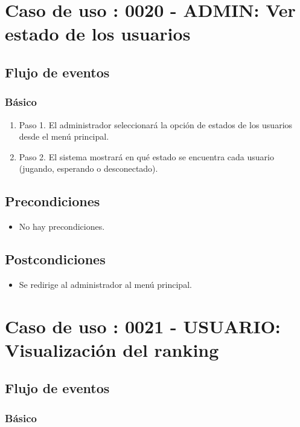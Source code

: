 \section{Caso de uso : 0020 - ADMIN: Ver estado de los usuarios}\label{sec:uc0}
\subsection{Flujo de eventos}
\subsubsection{Básico}

\begin{enumerate}
\item Paso 1.
El administrador seleccionará la opción de estados de los usuarios desde el menú principal.
\item Paso 2.
El sistema mostrará en qué estado se encuentra cada usuario (jugando, esperando o desconectado).
\end{enumerate}

\subsection{Precondiciones}
\begin{itemize}
\item No hay precondiciones.
\end{itemize}

\subsection{Postcondiciones}
\begin{itemize}
\item Se redirige al administrador al menú principal.
\end{itemize}



\section{Caso de uso : 0021 - USUARIO: Visualización del ranking}\label{sec:uc0}
\subsection{Flujo de eventos}
\subsubsection{Básico}

